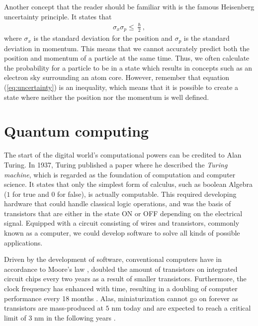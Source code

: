 
Another concept that the reader should be familiar with is the famous Heisenberg uncertainty principle. It states that
\begin{align}
    \sigma_x \sigma_p \leq \frac{\hslash}{2},
    \label{eq:uncertainty}
\end{align}
where $\sigma_x$ is the standard deviation for the position and $\sigma_p$ is the standard deviation in momentum. This means that we cannot accurately predict both the position and momentum of a particle at the same time. Thus, we often calculate the probability for a particle to be in a state which results in concepts such as an electron sky surrounding an atom core. However, remember that equation (\autoref{eq:uncertainty}) is an inequality, which means that it is possible to create a state where neither the position nor the momentum is well defined.

\section{Quantum computing}
The start of the digital world's computational powers can be credited to Alan Turing. In 1937, Turing \cite{Turing1937} published a paper where he described the \textit{Turing machine}, which is regarded as the foundation of computation and computer science. It states that only the simplest form of calculus, such as boolean Algebra ($1$ for true and $0$ for false), is actually computable. This required developing hardware that could handle classical logic operations, and was the basis of transistors that are either in the state ON or OFF depending on the electrical signal. Equipped with a circuit consisting of wires and transistors, commonly known as a computer, we could develop software to solve all kinds of possible applications.

Driven by the development of software, conventional computers have in accordance to Moore's law \cite{Moore1965}, doubled the amount of transistors on integrated circuit chips every two years as a result of smaller transistors. Furthermore, the clock frequency has enhanced with time, resulting in a doubling of computer performance every 18 months \cite{Pavicic2006}. Alas, miniaturization cannot go on forever as transistors are mass-produced at $5$ nm today and are expected to reach a critical limit of $3$ nm in the following years \cite{Gwennap2020}.

